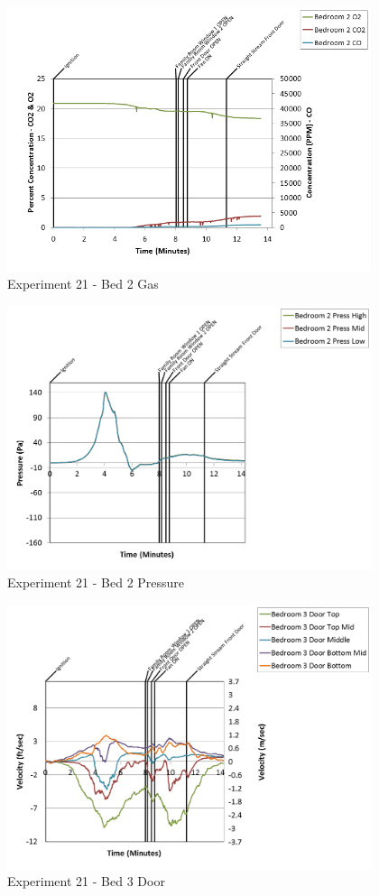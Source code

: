 \documentclass{article}
\begin{document}
\begin{appendices}
\begin{figure}[h!]
	\centering
	\includegraphics[height=3.05in]{0_Images/Results_Charts/Exp_21_Charts/Bed2Gas.png}
	\caption{Experiment 21 - Bed 2 Gas}
\end{figure}

\clearpage

\begin{figure}[h!]
	\centering
	\includegraphics[height=3.05in]{0_Images/Results_Charts/Exp_21_Charts/Bed2Pressure.png}
	\caption{Experiment 21 - Bed 2 Pressure}
\end{figure}


\begin{figure}[h!]
	\centering
	\includegraphics[height=3.05in]{0_Images/Results_Charts/Exp_21_Charts/Bed3Door.png}
	\caption{Experiment 21 - Bed 3 Door}
\end{figure}


\end{appendices}
\end{document}
